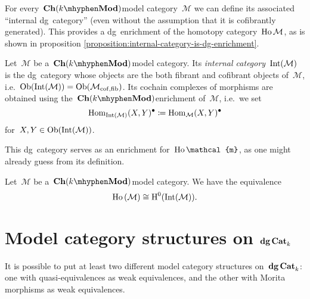 For every~$\Ch(k\mhyphen\Mod)$\dash model category~$\mathcal{M}$ we can define its associated ``internal dg~category'' (even without the assumption that it is cofibrantly generated). This provides a dg~enrichment of the homotopy category~$\mathrm{Ho} \,\mathcal{M}$, as is shown in proposition \ref{proposition:internal-category-is-dg-enrichment}.
\begin{definition}
  Let~$\mathcal{M}$ be a~$\Ch(k\mhyphen\Mod)$\dash model category. Its \emph{internal category}~$\operatorname{Int}(\mathcal{M})$ is the dg~category whose objects are the both fibrant and cofibrant objects of~$\mathcal{M}$, i.e.\ $\mathrm{Ob}(\operatorname{Int}(\mathcal{M}))=\mathrm{Ob}(\mathcal{M}_{\mathrm{cof},\mathrm{fib}})$. Its cochain complexes of morphisms are obtained using the~$\Ch(k\mhyphen\Mod)$\dash enrichment of~$\mathcal{M}$, i.e.\ we set
  \begin{equation}
    \mathrm{Hom}_{\operatorname{Int}(\mathcal{M})}(X,Y)^\bullet\coloneqq\mathrm{Hom}_{\mathcal{M}}(X,Y)^\bullet
  \end{equation}
  for~$X,Y\in\mathrm{Ob}(\operatorname{Int}(\mathcal{M}))$.
\end{definition}
This dg~category serves as an enrichment for~$\Ho\mathcal{m}$, as one might already guess from its definition.
\begin{proposition}
  \label{proposition:internal-category-is-dg-enrichment}
  Let~$\mathcal{M}$ be a~$\Ch(k\mhyphen\Mod)$\dash model category. We have the equivalence
  \begin{equation}
    \mathrm{Ho} \,(\mathcal{M})\cong\operatorname{H}^0(\operatorname{Int}(\mathcal{M})).
  \end{equation}
\end{proposition}


\section{Model category structures on \texorpdfstring{$\mathbf{dg\,Cat}_k$}{dgCat\textunderscore k}}
It is possible to put at least two different model category structures on~$\mathbf{dg\,Cat}_k$: one with quasi-equivalences as weak equivalences, and the other with Morita morphisms as weak equivalences.

